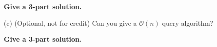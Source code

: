 \documentclass{article}
\begin{document}
\begin{itemize}
        \textbf{Give a 3-part solution.}

        \item [(c)] (Optional, not for credit) Can you give a $\mathcal{O}(n)$ query algorithm?

        \textbf{Give a 3-part solution.}
    \end{itemize}
\end{document}
